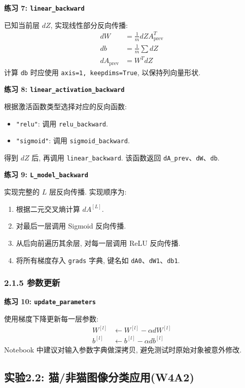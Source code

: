 \documentclass{../../nndlcourse}
\begin{document}
\textbf{练习 7: \texttt{linear\_backward}}

已知当前层 $dZ$, 实现线性部分反向传播:
\begin{align}
    dW &= \frac{1}{m}dZ A_{\mathrm{prev}}^T \\
    db &= \frac{1}{m}\sum dZ \\
    dA_{\mathrm{prev}} &= W^T dZ
\end{align}
计算 \texttt{db} 时应使用 \texttt{axis=1, keepdims=True}, 以保持列向量形状.

\textbf{练习 8: \texttt{linear\_activation\_backward}}

根据激活函数类型选择对应的反向函数:
\begin{itemize}
    \item \texttt{"relu"}: 调用 \texttt{relu\_backward}.
    \item \texttt{"sigmoid"}: 调用 \texttt{sigmoid\_backward}.
\end{itemize}
得到 $dZ$ 后, 再调用 \texttt{linear\_backward}. 该函数返回 \texttt{dA\_prev}、\texttt{dW}、\texttt{db}.

\textbf{练习 9: \texttt{L\_model\_backward}}

实现完整的 $L$ 层反向传播. 实现顺序为:
\begin{enumerate}
    \item 根据二元交叉熵计算 $dA^{[L]}$.
    \item 对最后一层调用 Sigmoid 反向传播.
    \item 从后向前遍历其余层, 对每一层调用 ReLU 反向传播.
    \item 将所有梯度存入 \texttt{grads} 字典, 键名如 \texttt{dA0}、\texttt{dW1}、\texttt{db1}.
\end{enumerate}

\subsubsection*{2.1.5 参数更新}

\textbf{练习 10: \texttt{update\_parameters}}

使用梯度下降更新每一层参数:
\begin{align}
    W^{[l]} &\leftarrow W^{[l]}-\alpha dW^{[l]} \\
    b^{[l]} &\leftarrow b^{[l]}-\alpha db^{[l]}
\end{align}
Notebook 中建议对输入参数字典做深拷贝, 避免测试时原始对象被意外修改.

\subsection*{实验2.2: 猫/非猫图像分类应用(W4A2)}
\end{document}
